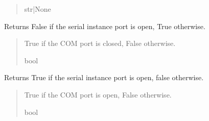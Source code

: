 \documentclass[letterpaper,10pt,english]{sphinxmanual}
\begin{document}
\begin{fulllineitems}
\begin{fulllineitems}
\begin{quote}
\begin{description}
\sphinxAtStartPar
str|None

\end{description}\end{quote}

\end{fulllineitems}


\begin{fulllineitems}
\label{\detokenize{SerialCommunication:SerialCommunication.COM_io.IsSerialClosed}}
\pysigstartsignatures
{}
\pysigstopsignatures
\sphinxAtStartPar
Returns False if the serial instance port is open, True otherwise.
\begin{quote}\begin{description}
\sphinxAtStartPar
True if the COM port is closed, False otherwise.

\sphinxAtStartPar
bool

\end{description}\end{quote}

\end{fulllineitems}


\begin{fulllineitems}
\label{\detokenize{SerialCommunication:SerialCommunication.COM_io.IsSerialOpen}}
\pysigstartsignatures
{}
\pysigstopsignatures
\sphinxAtStartPar
Returns True if the serial instance port is open, false otherwise.
\begin{quote}\begin{description}
\sphinxAtStartPar
True if the COM port is open, False otherwise.

\sphinxAtStartPar
bool

\end{description}\end{quote}

\end{fulllineitems}


\end{fulllineitems}
\end{document}
